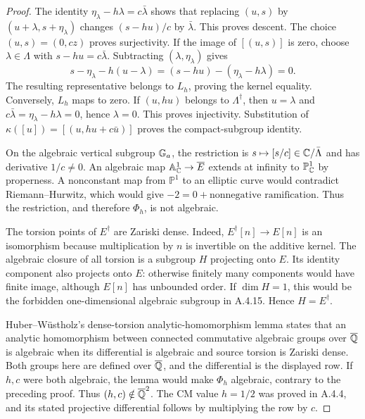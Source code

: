 \begin{proof}
The identity
$\eta_\lambda-h\lambda=c\bar\lambda$
shows that replacing $(u,s)$ by $(u+\lambda,s+\eta_\lambda)$
changes $(s-hu)/c$ by $\bar\lambda$. This proves descent.
The choice $(u,s)=(0,cz)$ proves surjectivity.
If the image of $[(u,s)]$ is zero, choose $\lambda\in\Lambda$
with $s-hu=c\bar\lambda$. Subtracting
$(\lambda,\eta_\lambda)$ gives
\[
 s-\eta_\lambda-h(u-\lambda)
 =(s-hu)-(\eta_\lambda-h\lambda)=0.
\]
The resulting representative belongs to $L_h$, proving the
kernel equality. Conversely, $L_h$ maps to zero.
If $(u,hu)$ belongs to $\Lambda^\dagger$, then $u=\lambda$
and $c\bar\lambda=\eta_\lambda-h\lambda=0$, hence $\lambda=0$.
This proves injectivity. Substitution of
$\kappa([u])=[(u,hu+c\bar u)]$ proves the compact-subgroup
identity.

On the algebraic vertical subgroup $\mathbb G_a$, the restriction is
$s\mapsto[s/c]\in\mathbb C/\bar\Lambda$ and has derivative $1/c\ne0$.
An algebraic map $\mathbb A^1_\mathbb C\to\overline E$ extends at
infinity to $\mathbb P^1_\mathbb C$ by properness. A nonconstant map
from $\mathbb P^1$ to an elliptic curve would contradict
Riemann--Hurwitz, which would give
$-2=0+\text{nonnegative ramification}$.
Thus the restriction, and therefore $\Phi_h$, is not algebraic.

The torsion points of $E^\dagger$ are Zariski dense.
Indeed, $E^\dagger[n]\to E[n]$ is an isomorphism because
multiplication by $n$ is invertible on the additive kernel.
The algebraic closure of all torsion is a subgroup $H$
projecting onto $E$. Its identity component also projects
onto $E$: otherwise finitely many components would have
finite image, although $E[n]$ has unbounded order.
If $\dim H=1$, this would be the forbidden one-dimensional
algebraic subgroup in A.4.15. Hence $H=E^\dagger$.

Huber--W\"ustholz's dense-torsion analytic-homomorphism
lemma \cite[Lemma 6.5, pp.45--46 of the opened manuscript]{EllHuberWustholz2022}
states that an analytic homomorphism between connected
commutative algebraic groups over $\overline{\mathbb Q}$ is algebraic when
its differential is algebraic and source torsion is
Zariski dense. Both groups here are defined over $\overline{\mathbb Q}$,
and the differential is the displayed row.
If $h,c$ were both algebraic, the lemma would make $\Phi_h$
algebraic, contrary to the preceding proof.
Thus $(h,c)\notin\overline{\mathbb Q}^2$. The CM value $h=1/2$ was proved
in A.4.4, and its stated projective differential follows
by multiplying the row by $c$.
\end{proof}

